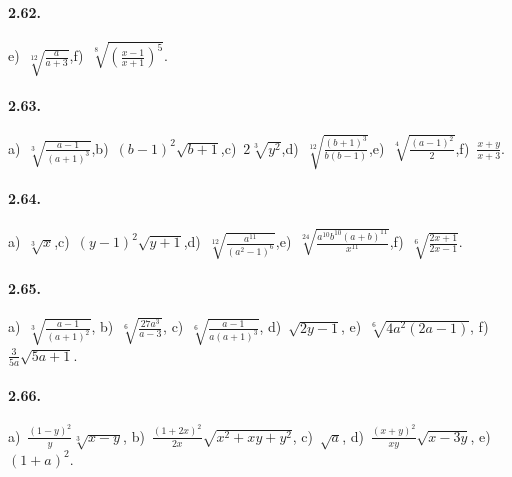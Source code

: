 \paragraph{2.62.}
e)~$\sqrt[12]{\frac a{a+3}}$,\quad f)~$\sqrt[8]{\left(\frac{x-1}{x+1}\right)^5}$.

\paragraph{2.63.}
a)~$\sqrt[3]{\frac{a-1}{(a+1)^3}}$,\quad b)~$(b-1)^2\sqrt{b+1}$,\quad c)~$2\sqrt[3]{y^2}$,\quad d)~$\sqrt[12]{\frac{(b+1)^3}{b(b-1)}}$,\quad e)~$\sqrt[4]{\frac{(a-1)^2} 2}$,\quad f)~$\frac{x+y}{x+3}$.

\paragraph{2.64.}
a)~$\sqrt[3]x$,\quad c)~$(y-1)^2\sqrt{y+1}$,\quad d)~$\sqrt[12]{\frac{a^{11}}{(a^2-1)^6}}$,\quad e)~$\sqrt[24]{\frac{a^{10}b^{10}(a+b)^{11}}{x^{11}}}$,\quad f)~$\sqrt[6]{\frac{2x+1}{2x-1}}$.

\paragraph{2.65.}
a)~$\sqrt[3]{\frac{a-1}{(a+1)^2}}$,\; b)~$\sqrt[6]{\frac{27a^3}{a-3}}$,\; c)~$\sqrt[6]{\frac{a-1}{a(a+1)^3}}$,\; d)~$\sqrt{2y-1}$,\; e)~$\sqrt[6]{4a^2(2a-1)}$,\; f)~$\frac 3{5a}\sqrt{5a+1}$.

\paragraph{2.66.}
a)~$\frac{(1-y)^2} y\sqrt[3]{x-y}$,\; b)~$\frac{(1+2x)^2}{2x}\sqrt{x^2+xy+y^2}$,\; c)~$\sqrt a$,\; d)~$\frac{(x+y)^2}{xy}\sqrt{x-3y}$,\; e)~$(1+a)^2$.

